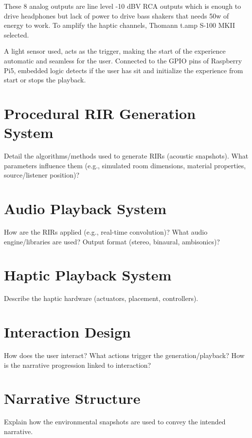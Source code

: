         These 8 analog outputs are line level -10 dBV RCA outputs which is enough to drive headphones but lack of power to drive bass shakers that needs 50w of energy to work. To amplify the haptic channels, Thomann t.amp S-100 MKII selected.\par

        A light sensor used, acts as the trigger, making the start of the experience automatic and seamless for the user. Connected to the GPIO pins of Raspberry Pi5, embedded logic detects if the user has sit and initialize the experience from start or stops the playback.\par
    \section{Procedural RIR Generation System} Detail the algorithms/methods used to generate RIRs (acoustic snapshots). What parameters influence them (e.g., simulated room dimensions, material properties, source/listener position)?
    \section{Audio Playback System} How are the RIRs applied (e.g., real-time convolution)? What audio engine/libraries are used? Output format (stereo, binaural, ambisonics)?
    \section{Haptic Playback System} Describe the haptic hardware (actuators, placement, controllers). 
    \section{Interaction Design} How does the user interact? What actions trigger the generation/playback? How is the narrative progression linked to interaction?
    \section{Narrative Structure} Explain how the environmental snapshots are used to convey the intended narrative.
